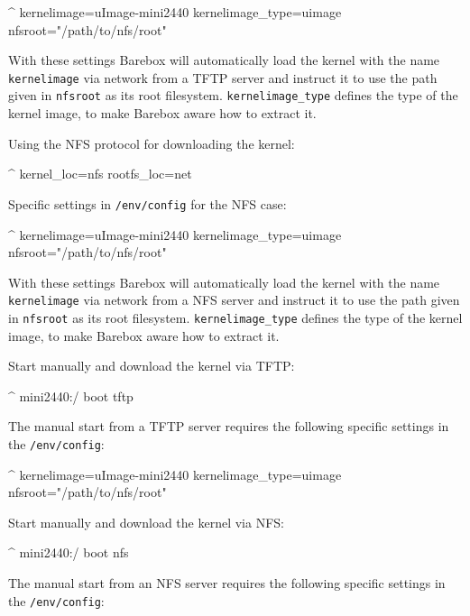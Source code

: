 \begin{ptxshell}[escapechar=|]{^}
kernelimage=uImage-mini2440
kernelimage_type=uimage
nfsroot="/path/to/nfs/root"
\end{ptxshell}

With these settings Barebox will automatically load the kernel with the name
\texttt{kernelimage} via network from a TFTP server and instruct it to use
the path given in \texttt{nfsroot} as its root filesystem.
\texttt{kernelimage\_type} defines the type of the kernel image, to make
Barebox aware how to extract it.

Using the NFS protocol for downloading the kernel:

\begin{ptxshell}[escapechar=|]{^}
kernel_loc=nfs
rootfs_loc=net
\end{ptxshell}

Specific settings in \texttt{/env/config} for the NFS case:

\begin{ptxshell}[escapechar=|]{^}
kernelimage=uImage-mini2440
kernelimage_type=uimage
nfsroot="/path/to/nfs/root"
\end{ptxshell}

With these settings Barebox will automatically load the kernel with the name
\texttt{kernelimage} via network from a NFS server and instruct it to use
the path given in \texttt{nfsroot} as its root filesystem.
\texttt{kernelimage\_type} defines the type of the kernel image, to make
Barebox aware how to extract it.

Start manually and download the kernel via TFTP:

\begin{ptxshell}[escapechar=|]{^}
mini2440:/ boot tftp
\end{ptxshell}

The manual start from a TFTP server requires the following specific settings
in the \texttt{/env/config}:

\begin{ptxshell}[escapechar=|]{^}
kernelimage=uImage-mini2440
kernelimage_type=uimage
nfsroot="/path/to/nfs/root"
\end{ptxshell}

Start manually and download the kernel via NFS:

\begin{ptxshell}[escapechar=|]{^}
mini2440:/ boot nfs
\end{ptxshell}

The manual start from an NFS server requires the following specific settings
in the \texttt{/env/config}:


